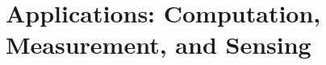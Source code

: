 \documentclass[twocolumn,10pt]{article}
\begin{document}
\section*{Applications: Computation, Measurement, and Sensing}
%



\end{document}
